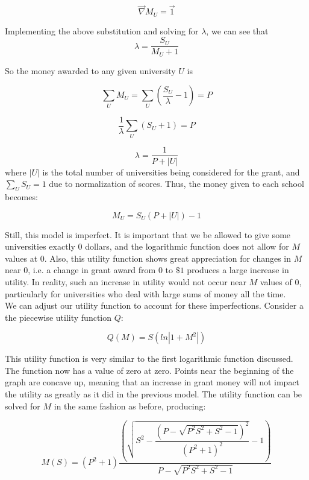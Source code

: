 \documentclass[paper.tex]{subfiles}
\begin{document}
	$$ \vec{\nabla} M_{U} = \vec{1} $$
	
	Implementing the above substitution and solving for $\lambda$, we can see that	
	$$\lambda = \dfrac{S_{U}}{M_{U}+1} $$
	
	So the money awarded to any given university $U$ is
	
	$$ \sum_{U}M_{U} = \sum_{U}(\dfrac{S_{U}}{\lambda} - 1) = P $$
	
	$$ \dfrac{1}{\lambda} \sum_{U}(S_{U} + 1) = P $$
	
	$$ \lambda = \dfrac{1}{P + |U|}$$
	where $|U|$ is the total number of universities being considered for the grant, and $\sum_{U}S_{U} = 1$ due to normalization of scores. Thus, the money given to each school becomes:
	
	$$ M_{U} = S_{U}(P+|U|) - 1$$
	
 	Still, this model is imperfect. It is important that we be allowed to give some universities exactly $0$ dollars, and the logarithmic function does not allow for $M$ values at $0$. Also, this utility function shows great appreciation for changes in $M$ near $0$, i.e. a change in grant award from $0$ to $\$1$ produces a large increase in utility. In reality, such an increase in utility would not occur near $M$ values of $0$, particularly for universities who deal with large sums of money all the time.
 	\\
 	We can adjust our utility function to account for these imperfections. Consider a the piecewise utility function $Q$:
 	
 	$$ Q(M) = S(ln|1+M^2|) $$
 	
 	This utility function is very similar to the first logarithmic function discussed. The function now has a value of zero at zero. Points near the beginning of the graph are concave up, meaning that an increase in grant money will not impact the utility as greatly as it did in the previous model. The utility function can be solved for $M$ in the same fashion as before, producing:
 	
 	$$ M(S) = (P^2+1) \dfrac{(\sqrt{S^2 - \dfrac{(P - \sqrt{P^2S^2 + S^2 - 1})^2}{(P^2 + 1)^2}} -1)}{P - \sqrt{P^2S^2 + S^2 - 1}}$$
	
	
\end{document}
